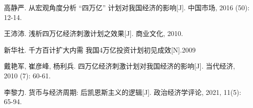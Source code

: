 \documentclass[UTF8,openany]{ctexbook}
\begin{document}
\newpage
\setlength{\bibsep}{1ex}  %
\begin{thebibliography}{99}
    \thispagestyle{fancy}

    高静严. 从宏观角度分析 “四万亿” 计划对我国经济的影响[J]. 中国市场, 2016 (50): 12-14.

    王沛沛. 浅析四万亿经济刺激计划之效果[J]. 商业文化, 2010.

    新华社. 千方百计扩大内需\,\,我国4万亿投资计划初见成效[N].2009

    戴艳军, 崔彦峰, 杨利兵. 四万亿经济刺激计划对我国经济的影响[J]. 当代经济, 2010 (7): 60-61.

    李黎力. 货币与经济周期: 后凯恩斯主义的逻辑[J]. 政治经济学评论, 2021, 11(5): 65-94.

\end{thebibliography}
\end{document}
